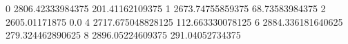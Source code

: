 0 2806.42333984375 201.41162109375
1 2673.74755859375 68.73583984375
2 2605.01171875 0.0
4 2717.675048828125 112.663330078125
6 2884.336181640625 279.324462890625
8 2896.05224609375 291.04052734375
